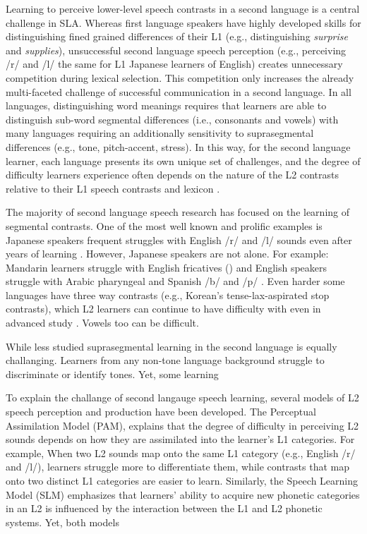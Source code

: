 Learning to perceive lower-level speech contrasts in a second language is a central challenge in SLA. Whereas first language speakers have highly developed skills for distinguishing fined grained differences of their L1 (e.g., distinguishing \textit{surprise} and \textit{supplies}), unsuccessful second language speech perception (e.g., perceiving /r/ and /l/ the same for L1 Japanese learners of English) creates unnecessary competition during lexical selection. This competition only increases the already multi-faceted challenge of successful communication in a second language. In all languages, distinguishing word meanings requires that learners are able to distinguish sub-word segmental differences (i.e., consonants and vowels) with many languages requiring an additionally sensitivity to suprasegmental differences (e.g., tone, pitch-accent, stress). In this way, for the second language learner, each language presents its own unique set of challenges, and the degree of difficulty learners experience often depends on the nature of the L2 contrasts relative to their L1 speech contrasts and lexicon \parencite{Flege1995,Best1995,BestTyler2007,vanLeussenEscudero2015}.

The majority of second language speech research has focused on the learning of segmental contrasts. One of the most well known and prolific examples is Japanese speakers frequent struggles with English /r/ and /l/ sounds even after years of learning \parencite{Brown2000}. However, Japanese speakers are not alone. For example: Mandarin learners struggle with English fricatives () \cite{Wiener2022} and English speakers struggle with Arabic pharyngeal \cite{Burnham2013} and Spanish /b/ and /p/ \cite{Nagle2022}. Even harder some languages have three way contrasts (e.g., Korean's tense-lax-aspirated stop contrasts), which L2 learners can continue to have difficulty with even in advanced study \cite{Kim2023}. Vowels too can be difficult. 

While less studied suprasegmental learning in the second language is equally challanging. Learners from any non-tone language background struggle to discriminate or identify tones. Yet, some learning 

To explain the challange of second langauge speech learning, several models of L2 speech perception and production have been developed. The Perceptual Assimilation Model (PAM), explains that the degree of difficulty in perceiving L2 sounds depends on how they are assimilated into the learner’s L1 categories. For example, When two L2 sounds map onto the same L1 category (e.g., English /r/ and /l/), learners struggle more to differentiate them, while contrasts that map onto two distinct L1 categories are easier to learn. Similarly, the Speech Learning Model (SLM) emphasizes that learners’ ability to acquire new phonetic categories in an L2 is influenced by the interaction between the L1 and L2 phonetic systems. Yet, both models 



